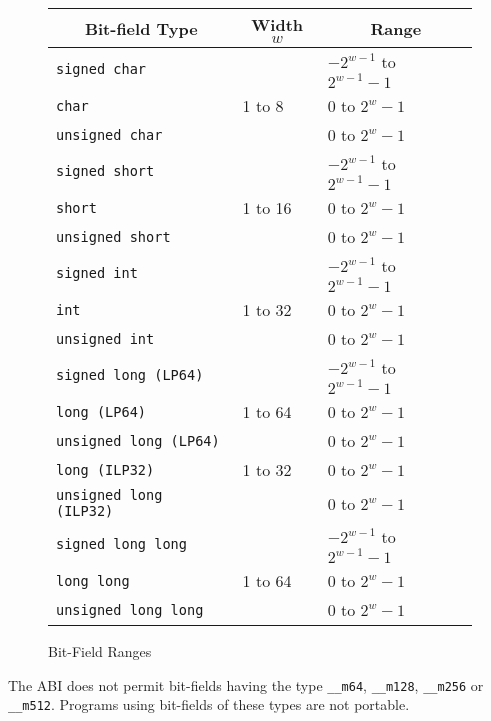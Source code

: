 \begin{figure}[h]
\Hrule
  \caption{Bit-Field Ranges}
  \begin{center}
    \leavevmode
    \begin{tabular}{l|l|l}
      \multicolumn{1}{c}{Bit-field Type}
         & \multicolumn{1}{c}{Width $w$}
         & \multicolumn{1}{c}{Range} \\
      \hline
      \texttt{signed char} & & $-2^{w - 1}$ to $2^{w-1}-1$ \\
      \texttt{char} & 1 to 8 & 0 to $2^{w}-1$ \\
      \texttt{unsigned char} & & 0 to $2^{w}-1$ \\
      \hline
      \texttt{signed short} & & $-2^{w - 1}$ to $2^{w-1}-1$ \\
      \texttt{short} & 1 to 16 & 0 to $2^{w}-1$ \\
      \texttt{unsigned short} & & 0 to $2^{w}-1$ \\
      \hline
      \texttt{signed int} & & $-2^{w - 1}$ to $2^{w-1}-1$ \\
      \texttt{int} & 1 to 32 & 0 to $2^{w}-1$ \\
      \texttt{unsigned int} & & 0 to $2^{w}-1$ \\
      \hline
      \texttt{signed long (LP64)} & & $-2^{w - 1}$ to $2^{w-1}-1$ \\
      \texttt{long (LP64)} & 1 to 64 & 0 to $2^{w}-1$ \\
      \texttt{unsigned long (LP64)} & & 0 to $2^{w}-1$ \\
      \hline
      \texttt{long (ILP32)} & 1 to 32 & 0 to $2^{w}-1$ \\
      \texttt{unsigned long (ILP32)} & & 0 to $2^{w}-1$ \\
      \hline
      \texttt{signed long long} & & $-2^{w - 1}$ to $2^{w-1}-1$ \\
      \texttt{long long} & 1 to 64 & 0 to $2^{w}-1$ \\
      \texttt{unsigned long long} & & 0 to $2^{w}-1$ \\
    \end{tabular}
  \end{center}
\Hrule
\end{figure}

The ABI does not permit bit-fields having the type \texttt{__m64},
\texttt{__m128}, \texttt{__m256} or \texttt{__m512}.  Programs using
bit-fields of these types are not portable.

